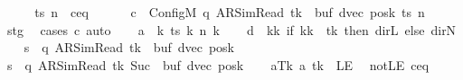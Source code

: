 \begin{isabellebody}
\ {\isacharminus}{\kern0pt}\isanewline
\ \ \isamarkupfalse%
\ ts\ n\ \ c{\isacharprime}{\kern0pt}{\isacharunderscore}{\kern0pt}eq{\isacharcolon}{\kern0pt}\isanewline
\ \ \ \ \ \ {\isachardoublequoteopen}c{\isacharprime}{\kern0pt}\ {\isacharequal}{\kern0pt}\ Config\isactrlsub M\ {\isacharparenleft}{\kern0pt}q{\isacharcomma}{\kern0pt}\ AR{\isacharunderscore}{\kern0pt}SimRead{\isacharcomma}{\kern0pt}\ tk{\isacharcomma}{\kern0pt}\ {}{\isacharcomma}{\kern0pt}\ buf{\isacharcomma}{\kern0pt}\ dvec{\isacharcomma}{\kern0pt}\ posk{\isacharparenright}{\kern0pt}\ ts\ n{\isachardoublequoteclose}\isanewline
\ \ \ \ \isamarkupfalse%
\ stg\ \isamarkupfalse%
\ {\isacharparenleft}{\kern0pt}cases\ c{\isacharprime}{\kern0pt}{\isacharparenright}{\kern0pt}\ auto\isanewline
\ \ \isamarkupfalse%
\ {\isacharquery}{\kern0pt}a\ {\isacharequal}{\kern0pt}\ {\isachardoublequoteopen}{\isasymlambda}k{\isachardot}{\kern0pt}\ ts\ k\ {\isacharparenleft}{\kern0pt}n\ k{\isacharparenright}{\kern0pt}{\isachardoublequoteclose}\isanewline
\ \ \isamarkupfalse%
\ {\isacharquery}{\kern0pt}d\ {\isacharequal}{\kern0pt}\ {\isachardoublequoteopen}{\isasymlambda}kk{\isachardot}{\kern0pt}\ if\ kk\ {\isacharequal}{\kern0pt}\ tk\ then\ dir{\isachardot}{\kern0pt}L\ else\ dir{\isachardot}{\kern0pt}N{\isachardoublequoteclose}\isanewline
\ \ \isamarkupfalse%
\ {\isacharquery}{\kern0pt}s\ {\isacharequal}{\kern0pt}\ {\isachardoublequoteopen}{\isacharparenleft}{\kern0pt}q{\isacharcomma}{\kern0pt}\ AR{\isacharunderscore}{\kern0pt}SimRead{\isacharcomma}{\kern0pt}\ tk{\isacharcomma}{\kern0pt}\ {}{\isacharcomma}{\kern0pt}\ buf{\isacharcomma}{\kern0pt}\ dvec{\isacharcomma}{\kern0pt}\ posk{\isacharparenright}{\kern0pt}{\isachardoublequoteclose}\isanewline
\ \ \isamarkupfalse%
\ {\isacharquery}{\kern0pt}s{\isacharprime}{\kern0pt}\ {\isacharequal}{\kern0pt}\ {\isachardoublequoteopen}{\isacharparenleft}{\kern0pt}q{\isacharcomma}{\kern0pt}\ AR{\isacharunderscore}{\kern0pt}SimRead{\isacharcomma}{\kern0pt}\ tk{\isacharcomma}{\kern0pt}\ Suc\ {}{\isacharcomma}{\kern0pt}\ buf{\isacharcomma}{\kern0pt}\ dvec{\isacharcomma}{\kern0pt}\ posk{\isacharparenright}{\kern0pt}{\isachardoublequoteclose}\isanewline
\ \ \isamarkupfalse%
\ aTk{\isacharcolon}{\kern0pt}\ {\isachardoublequoteopen}{\isacharquery}{\kern0pt}a\ tk\ {\isasymnoteq}\ LE{}{\isachardoublequoteclose}\ \isamarkupfalse%
\ notLE\ c{\isacharprime}{\kern0pt}{\isacharunderscore}{\kern0pt}eq\ \isamarkupfalse%

\end{isabellebody}
